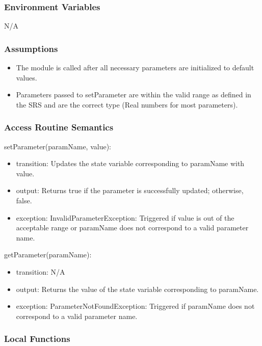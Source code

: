 \documentclass[12pt, titlepage]{article}
\begin{document}
\subsubsection{Environment Variables}

N/A

\subsubsection{Assumptions}

\begin{itemize}
  \item The module is called after all necessary parameters are initialized to default values.
  \item Parameters passed to setParameter are within the valid range as defined in the SRS and are the correct type (Real numbers for most parameters).
\end{itemize}

\subsubsection{Access Routine Semantics}

\noindent setParameter(paramName, value):
\begin{itemize}
\item transition: Updates the state variable corresponding to paramName with value.
\item output: Returns true if the parameter is successfully updated; otherwise, false.
\item exception: InvalidParameterException: Triggered if value is out of the acceptable range or paramName does not correspond to a valid parameter name.
\end{itemize}

\noindent getParameter(paramName):
\begin{itemize}
\item transition: N/A
\item output: Returns the value of the state variable corresponding to paramName.
\item exception: ParameterNotFoundException: Triggered if paramName does not correspond to a valid parameter name.
\end{itemize}

\subsubsection{Local Functions}
\end{document}
